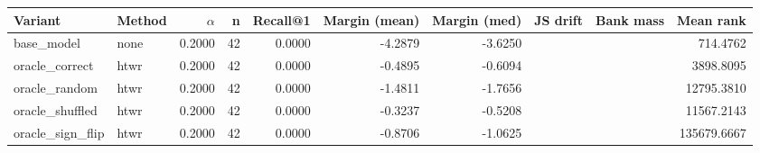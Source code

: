 \begin{tabular}{l l r r r r r r r r}
\toprule
Variant & Method & $\alpha$ & n & Recall@1 & Margin (mean) & Margin (med) & JS drift & Bank mass & Mean rank \\
\midrule
base\_model & none & 0.2000 & 42 & 0.0000 & -4.2879 & -3.6250 &  &  & 714.4762 \\
oracle\_correct & htwr & 0.2000 & 42 & 0.0000 & -0.4895 & -0.6094 &  &  & 3898.8095 \\
oracle\_random & htwr & 0.2000 & 42 & 0.0000 & -1.4811 & -1.7656 &  &  & 12795.3810 \\
oracle\_shuffled & htwr & 0.2000 & 42 & 0.0000 & -0.3237 & -0.5208 &  &  & 11567.2143 \\
oracle\_sign\_flip & htwr & 0.2000 & 42 & 0.0000 & -0.8706 & -1.0625 &  &  & 135679.6667 \\
\bottomrule
\end{tabular}
